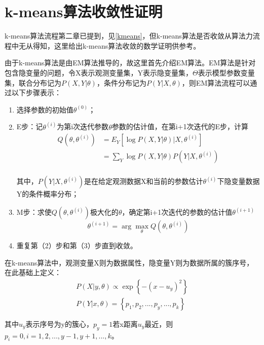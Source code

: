 
\thesisappendix

\chapter{k-means算法收敛性证明}

k-means算法流程第二章已提到，见\ref{kmeans}，但k-means算法是否收敛从算法力流程中无从得知，这里给出k-means算法收敛的数学证明供参考。

由于k-means算法是由EM算法推导的，故这里首先介绍EM算法。EM算法是针对包含隐变量的问题，令X表示观测变量集，Y表示隐变量集，$\varTheta $表示模型参数变量集，联合分布记为$P(X,Y|\theta)$，条件分布记为$P(Y|X,\theta)$，则EM算法流程可以通过以下步骤表示：
\begin{enumerate}
\item 选择参数的初始值$\theta ^{\left( 0 \right)}$；
\item E步：记$\theta ^{\left( i \right)}$为第i次迭代参数$\theta$参数的估计值，在第i+1次迭代的E步，计算
$$\begin{aligned}
	Q\left( \theta ,\theta ^{\left( i \right)} \right) &=E_Y\left[ \log P\left( X,Y|\theta \right) |X,\theta ^{\left( i \right)} \right]\\
	&=\sum_Y{\log}P\left( X,Y|\theta \right) P\left( Y|X,\theta ^{\left( i \right)} \right)\\
\end{aligned}$$

其中，$P\left( Y|X,\theta ^{\left( i \right)} \right)$是在给定观测数据X和当前的参数估计$\theta ^{\left( i \right)}$下隐变量数据Y的条件概率分布；
\item M步：求使$Q\left( \theta ,\theta ^{\left( i \right)} \right)$极大化的$\theta$，确定第i+1次迭代的参数的估计值$\theta ^{\left( i+1 \right)}$
$$
\theta^{(i+1)}=\arg \max _{\theta} Q\left(\theta, \theta^{(i)}\right)
$$
\item 重复第（2）步和第（3）步直到收敛。 
\end{enumerate}

在k-means算法中，观测变量X则为数据属性，隐变量Y则为数据所属的簇序号，在此基础上定义：
$$\begin{aligned}
P\left( X|y,\theta \right) \propto \exp \left\{ -\left( x-u_y \right) ^2 \right\} \\
P\left( Y|x,\theta \right) =\left\{ p_1,p_2,...,p_y,...,p_k \right\} 
\end{aligned}
$$

其中$u_y$表示序号为y的簇心，$p_y=1$若x距离$u_y$最近，则$p_i=0,i=1,2,...,y-1,y+1,...,k$。

